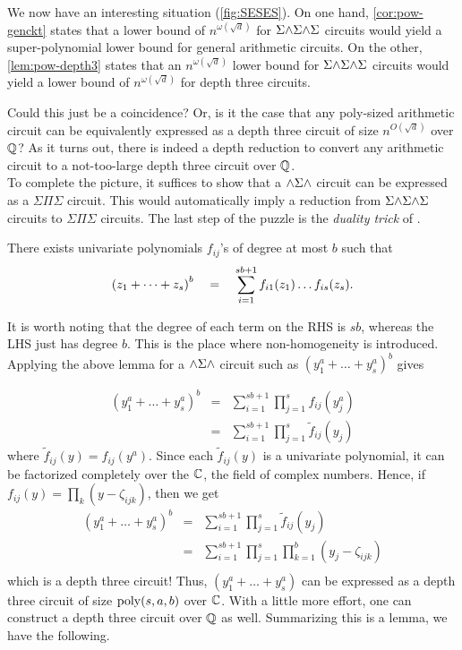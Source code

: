 We now have an interesting situation (\autoref{fig:SESES}).
On one hand, \autoref{cor:pow-genckt} states that a lower bound of
$n^{\omega(\sqrt{d})}$ for $\Sigma\mathord{\wedge}\Sigma\mathord{\wedge}\Sigma$ circuits would yield a
super-polynomial lower bound for general arithmetic circuits.
On the other, \autoref{lem:pow-depth3} states that an
$n^{\omega(\sqrt{d})}$ lower bound for $\Sigma\mathord{\wedge}\Sigma\mathord{\wedge}\Sigma$ circuits would yield a
lower bound of $n^{\omega(\sqrt{d})}$ for depth three circuits. 

Could this just be a coincidence? Or, is it the case that any
poly-sized arithmetic circuit can be equivalently expressed as a depth
three circuit of size $n^{O(\sqrt{d})}$ over $\mathbb{Q}$? As it turns out,
there is indeed a depth reduction to convert any arithmetic circuit to
a not-too-large depth three circuit over $\mathbb{Q}$. \\

To complete the picture, it suffices to show that a
$\mathord{\wedge}\Sigma\mathord{\wedge}$ circuit can be expressed as a
$\Sigma\Pi\Sigma$ circuit.
This would automatically imply a reduction from $\Sigma\mathord{\wedge}\Sigma\mathord{\wedge}\Sigma$ circuits to
$\Sigma\Pi\Sigma$ circuits.
The last step of the puzzle is the \emph{duality trick} of
\cite{sax08}. 

\begin{lemma}\label{lem:duality} There exists univariate polynomials $f_{ij}$'s of degree at most $b$ such that
$$
\left(z_1 + \dots + z_s\right)^b \quad = \quad \sum_{i=1}^{sb+1}
f_{i1}(z_1)\dots f_{is}(z_s).
$$
\end{lemma}

It is worth noting that the degree of each term on the RHS is $sb$,
whereas the LHS just has degree $b$.
This is the place where non-homogeneity is introduced.
Applying the above lemma for a $\mathord{\wedge}\Sigma\mathord{\wedge}$ circuit such
as $(y_1^a + \dots + y_s^a)^b$ gives

\begin{eqnarray*}
  (y_1^a + \dots + y_s^a)^b & = & \sum_{i=1}^{sb+1} \prod_{j=1}^s f_{ij}(y_j^a)\\
  & = & \sum_{i=1}^{sb+1} \prod_{j=1}^s \tilde{f}_{ij}(y_j)
\end{eqnarray*}
where $\tilde{f}_{ij}(y) = f_{ij}(y^a)$.
Since each $\tilde{f}_{ij}(y)$ is a univariate polynomial, it can be
factorized completely over the $\mathbb{C}$, the field of complex numbers.
Hence, if $f_{ij}(y) = \prod_k (y - \zeta_{ijk})$, then we get
\begin{eqnarray*}
  (y_1^a + \dots + y_s^a)^b & = & \sum_{i=1}^{sb+1} \prod_{j=1}^s \tilde{f}_{ij}(y_j)\\
  &= & \sum_{i=1}^{sb+1} \prod_{j=1}^s \prod_{k=1}^b (y_j - \zeta_{ijk})\\
\end{eqnarray*}
which is a depth three circuit! Thus, $(y_1^a + \dots + y_s^a)$ can be
expressed as a depth three circuit of size $\mathrm{poly}(s,a,b)$ over $\mathbb{C}$.
With a little more effort, one can construct a depth three circuit
over $\mathbb{Q}$ as well.
Summarizing this is a lemma, we have the following. 

